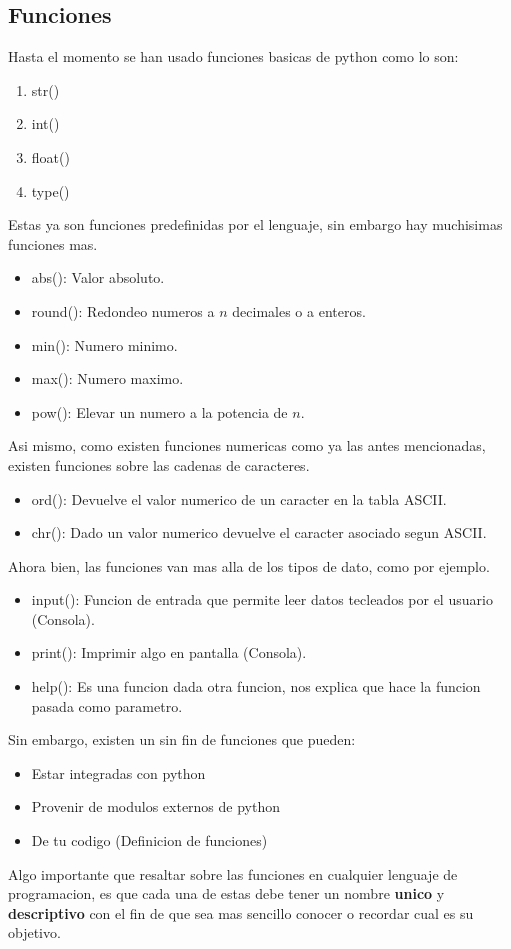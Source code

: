 \documentclass{article}
\begin{document}
\subsection{Funciones}
Hasta el momento se han usado funciones basicas de python como lo son:
\begin{enumerate}
    \item str()
    \item int()
    \item float()
    \item type()
\end{enumerate}
Estas ya son funciones predefinidas por el lenguaje, sin embargo hay muchisimas funciones mas.
\begin{itemize}
    \item abs(): Valor absoluto.
    \item round(): Redondeo numeros a \(n\) decimales o a enteros.
    \item min(): Numero minimo.
    \item max(): Numero maximo.
    \item pow(): Elevar un numero a la potencia de \(n\).
\end{itemize}
Asi mismo, como existen funciones numericas como ya las antes mencionadas, existen funciones sobre las cadenas de caracteres.
\begin{itemize}
    \item ord(): Devuelve el valor numerico de un caracter en la tabla ASCII.
    \item chr(): Dado un valor numerico devuelve el caracter asociado segun ASCII.
\end{itemize}
Ahora bien, las funciones van mas alla de los tipos de dato, como por ejemplo.
\begin{itemize}
    \item input(): Funcion de entrada que permite leer datos tecleados por el usuario (Consola).
    \item print(): Imprimir algo en pantalla (Consola).
    \item help(): Es una funcion dada otra funcion, nos explica que hace la funcion pasada como parametro.
\end{itemize}
Sin embargo, existen un sin fin de funciones que pueden:
\begin{itemize}
    \item Estar integradas con python
    \item Provenir de modulos externos de python
    \item De tu codigo (Definicion de funciones)
\end{itemize}
Algo importante que resaltar sobre las funciones en cualquier lenguaje de programacion, es que cada una de estas debe tener un nombre \textbf{unico} y \textbf{descriptivo} con el fin de que sea mas sencillo conocer o recordar cual es su objetivo.
\end{document}
